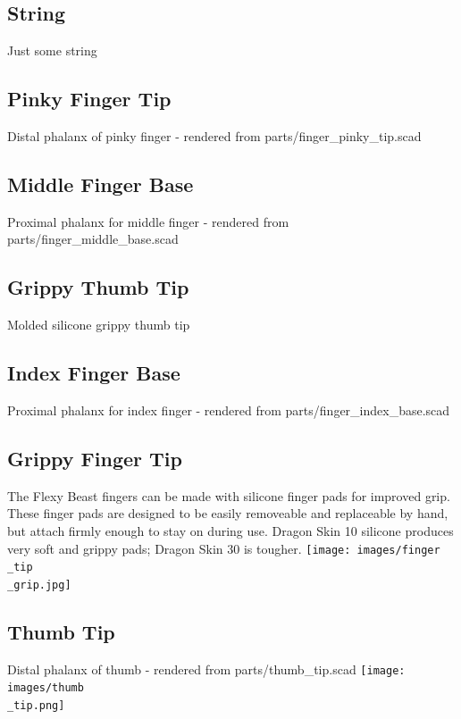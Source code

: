 \documentclass[11pt]{article}
\begin{document}
\hypertarget{thing_string}{\subsection{String}}
Just some string

\hypertarget{thing_pinky\_tip}{\subsection{Pinky Finger Tip}}
Distal phalanx of pinky finger - rendered from parts/finger_pinky_tip.scad

\hypertarget{thing_middle\_base}{\subsection{Middle Finger Base}}
Proximal phalanx for middle finger - rendered from parts/finger_middle_base.scad

\hypertarget{thing_thumb\_tip\_grip}{\subsection{Grippy Thumb Tip}}
Molded silicone grippy thumb tip

\hypertarget{thing_index\_base}{\subsection{Index Finger Base}}
Proximal phalanx for index finger - rendered from parts/finger_index_base.scad

\hypertarget{thing_finger\_tip\_grip}{\subsection{Grippy Finger Tip}}
The Flexy Beast fingers can be made with silicone finger pads for improved grip. These finger pads are designed to be easily removeable and replaceable by hand, but attach firmly enough to stay on during use. Dragon Skin 10 silicone produces very soft and grippy pads; Dragon Skin 30 is tougher.
\texttt{[image: images/finger\\\_tip\\\_grip.jpg]}

\hypertarget{thing_thumb\_tip}{\subsection{Thumb Tip}}
Distal phalanx of thumb - rendered from parts/thumb_tip.scad
\texttt{[image: images/thumb\\\_tip.png]}
\end{document}
